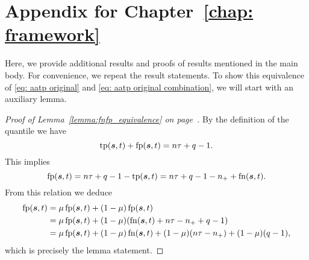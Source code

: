 \chapter{Appendix for Chapter~\ref{chap: framework}}

Here, we provide additional results and proofs of results mentioned in the main body. For convenience, we repeat the result statements. To show this equivalence of \eqref{eq: aatp original} and \eqref{eq: aatp original combination}, we will start with an auxiliary lemma.

\lemmaequivalence*
\begin{proof}[Proof of Lemma~\ref{lemma:fnfp_equivalence} on page~\pageref{lemma:fnfp_equivalence}]
  By the definition of the quantile we have
  \begin{equation*}
    \operatorname{tp}(\bm{s},t)+\operatorname{fp}(\bm{s},t) = n\tau + q-1.
  \end{equation*}
  This implies
  \begin{equation*}
    \operatorname{fp}(\bm{s},t)=n\tau +q - 1-\operatorname{tp}(\bm{s},t) =n\tau+q-1-n_{+} +\operatorname{fn}(\bm{s},t).
  \end{equation*}
  From this relation we deduce
  \begin{equation*}
    \begin{aligned}
      \fp(\bm{s},t)
      & = \mu \fp(\bm{s},t) + (1 - \mu)\fp(\bm{s},t) \\
      & = \mu \fp(\bm{s},t) + (1 - \mu)\Brac{\fn(\bm{s},t) + n\tau - \npos + q - 1} \\
      & = \mu \fp(\bm{s},t) + (1 - \mu)\fn(\bm{s},t) + (1-\mu)\Brac{n\tau - \npos} + (1-\mu)\Brac{q - 1},
    \end{aligned}
  \end{equation*}
  which is precisely the lemma statement.
\end{proof}
